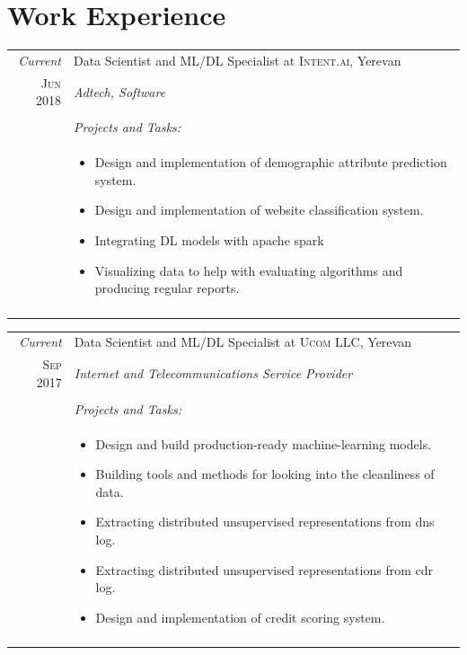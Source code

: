 \documentclass[a4paper,12pt]{article}
\begin{document}
\section{Work Experience}

\begin{tabular}{r|p{12.2cm}}
 \emph{Current} & Data Scientist and ML/DL Specialist at \textsc{Intent.ai}, Yerevan \\\textsc{Jun 2018}&\emph{Adtech, Software} \\\cline{2-2}& \\& \emph{Projects and Tasks:}\\&\footnotesize{
 \begin{itemize}
  \item Design and implementation of demographic attribute prediction system.
  \item Design and implementation of website classification system.
  \item Integrating DL models with apache spark
  \item Visualizing data to help with evaluating algorithms and producing regular reports.
\end{itemize}}\\\multicolumn{2}{c}{} 
\end{tabular}

\begin{tabular}{r|p{12.2cm}}
 \emph{Current} & Data Scientist and ML/DL Specialist at \textsc{Ucom LLC}, Yerevan \\\textsc{Sep 2017}&\emph{Internet and Telecommunications Service Provider} \\\cline{2-2}& \\& \emph{Projects and Tasks: }\\&\footnotesize{
 \begin{itemize}
 \item Design and build production-ready machine-learning models.
  \item Building tools and methods for looking into the cleanliness of data.
  \item Extracting distributed unsupervised representations from dns log.
  \item Extracting distributed unsupervised representations from cdr log.
  \item Design and implementation of credit scoring system.

\end{itemize}}\\\multicolumn{2}{c}{} 
\end{tabular}
\end{document}
